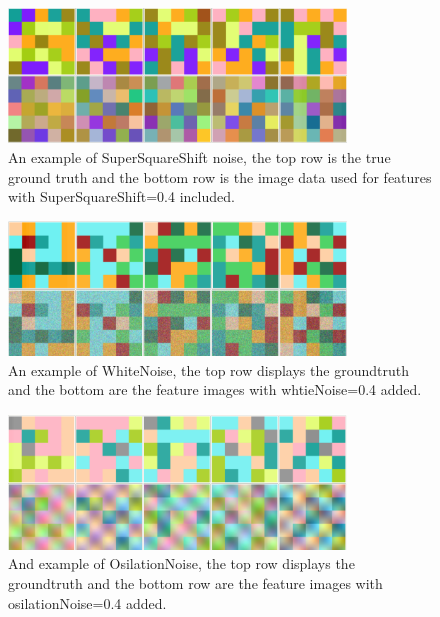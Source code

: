 \begin{figure}
  \centering
  \includegraphics[width=0.8\textwidth]{images/generatedData__none_color_20_150_0_01_8_0_4_0_0_0_0_1_0_10_20___.png}
  \caption{ An example of SuperSquareShift noise, the top row is the true ground truth and the bottom row is the image data used for features with SuperSquareShift=0.4 included.  } 
  \label{fig:squareNoise}
\end{figure} 

\begin{figure}
  \centering
  \includegraphics[width=0.8\textwidth]{images/generatedData__none_color_20_150_0_01_8_0_0_0_4_0_0_1_0_10_12___.png}
  \caption{ An example of WhiteNoise, the top row displays the groundtruth and the bottom are the feature images with whtieNoise=0.4 added. } 
  \label{fig:whiteNoise}
\end{figure} 

\begin{figure}
  \centering
  \includegraphics[width=0.8\textwidth]{images/generatedData__none_color_20_150_0_01_8_0_0_0_0_0_4_1_0_10_12___.png}
  \caption{ And example of OsilationNoise, the top row displays the groundtruth and the bottom row are the feature images with osilationNoise=0.4 added. } 
  \label{fig:osIlNoise}
\end{figure} 

